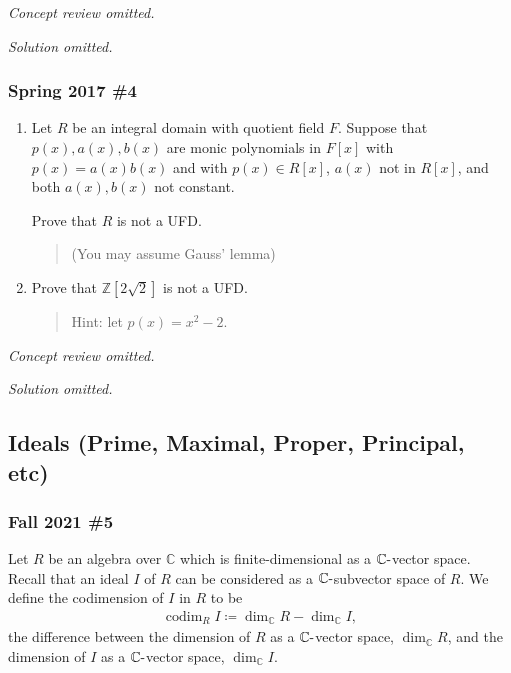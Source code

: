 \emph{Concept review omitted.}

\emph{Solution omitted.}

\hypertarget{spring-2017-4}{%
\subsubsection{Spring 2017 \#4}\label{spring-2017-4}}

\begin{enumerate}
\def\labelenumi{\alph{enumi}.}
\item
  Let \(R\) be an integral domain with quotient field \(F\). Suppose
  that \(p(x), a(x), b(x)\) are monic polynomials in \(F[x]\) with
  \(p(x) = a(x) b(x)\) and with \(p(x) \in R[x]\), \(a(x)\) not in
  \(R[x]\), and both \(a(x), b(x)\) not constant.

  Prove that \(R\) is not a UFD.

  \begin{quote}
  (You may assume Gauss' lemma)
  \end{quote}
\item
  Prove that \({\mathbb{Z}}[2\sqrt{2}]\) is not a UFD.

  \begin{quote}
  Hint: let \(p(x) = x^2-2\).
  \end{quote}
\end{enumerate}

\emph{Concept review omitted.}

\emph{Solution omitted.}

\hypertarget{ideals-prime-maximal-proper-principal-etc}{%
\subsection{Ideals (Prime, Maximal, Proper, Principal,
etc)}\label{ideals-prime-maximal-proper-principal-etc}}

\hypertarget{fall-2021-5}{%
\subsubsection{Fall 2021 \#5}\label{fall-2021-5}}

Let \(R\) be an algebra over \(\mathbb{C}\) which is finite-dimensional
as a \({\mathbb{C}}{\hbox{-}}\)vector space. Recall that an ideal \(I\)
of \(R\) can be considered as a \({\mathbb{C}}{\hbox{-}}\)subvector
space of \(R\). We define the codimension of \(I\) in \(R\) to be
\begin{align*}
\operatorname{codim}_R I \coloneqq
\dim_{{\mathbb{C}}} R - \dim_{{\mathbb{C}}} I
,\end{align*}
the difference between the dimension of \(R\) as a
\(\mathbb{C}{\hbox{-}}\)vector space, \(\dim_{{\mathbb{C}}} R\), and the
dimension of \(I\) as a \({\mathbb{C}}{\hbox{-}}\)vector space,
\(\dim_{\mathbb{C}}I\).

